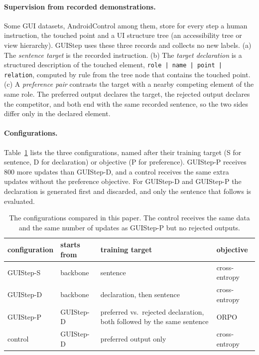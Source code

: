 \documentclass[runningheads,a4paper]{llncs}
\begin{document}
\paragraph{Supervision from recorded demonstrations.}
Some GUI datasets, AndroidControl among them, store for every step a human instruction, the touched point and a UI structure tree (an accessibility tree or view hierarchy). GUIStep uses these three records and collects no new labels. (a) The \emph{sentence target} is the recorded instruction. (b) The
\emph{target declaration} is a structured description of the touched element,
\texttt{role | name | point | relation}, computed by rule from the tree node that contains the
touched point. (c) A \emph{preference pair} contrasts the target with a nearby competing element
of the same role. The preferred output declares the target, the rejected output declares the
competitor, and both end with the same recorded sentence, so the two sides differ only in the
declared element.

\paragraph{Configurations.}
Table~\ref{tab:configs} lists the three configurations, named after their training target (S for sentence, D for declaration) or objective (P for preference). \mbox{GUIStep-P} receives $800$ more updates than \mbox{GUIStep-D}, and a control receives the same extra updates without the preference objective. For \mbox{GUIStep-D} and
\mbox{GUIStep-P} the declaration is generated first and discarded, and only the sentence that follows is
evaluated.

\begin{table}[t]
\centering
\caption{The configurations compared in this paper. The control receives the same data and the
same number of updates as \mbox{GUIStep-P} but no rejected outputs.}
\label{tab:configs}
\setlength{\tabcolsep}{4pt}
\begin{tabular}{llp{4.2cm}l}
\toprule
configuration & starts from & training target & objective\\
\midrule
\mbox{GUIStep-S} & backbone & sentence & cross-entropy\\
\mbox{GUIStep-D} & backbone & declaration, then sentence & cross-entropy\\
\mbox{GUIStep-P} & \mbox{GUIStep-D} & preferred vs.\ rejected declaration, both followed by the same sentence & ORPO~\cite{orpo}\\
control & \mbox{GUIStep-D} & preferred output only & cross-entropy\\
\bottomrule
\end{tabular}
\end{table}
\end{document}
